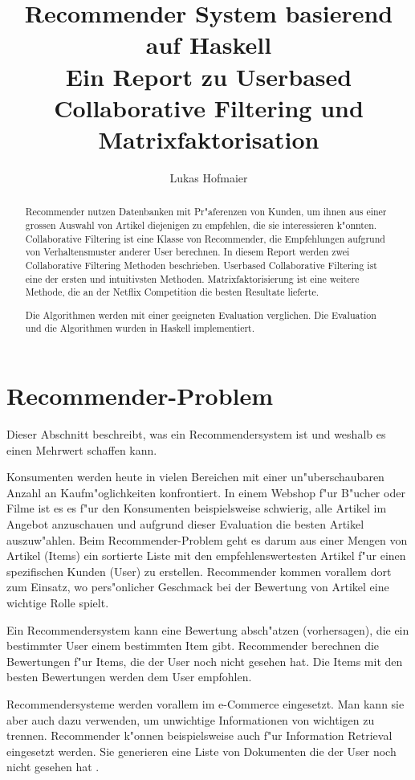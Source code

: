 \documentclass[a4paper, 12pt]{article}
\author{Lukas Hofmaier}
\title{Recommender System basierend auf Haskell \\ \vspace{2 mm} {\large Ein Report zu Userbased Collaborative Filtering und Matrixfaktorisation}}
\begin{document}
\lstset{basicstyle=\small,
language=Haskell,
stringstyle=ttfamiliy
}

\maketitle
\newpage
\tableofcontents
\newpage
\begin{abstract}
Recommender nutzen Datenbanken mit Pr"aferenzen von Kunden, um ihnen aus einer grossen Auswahl von Artikel diejenigen zu empfehlen, die sie interessieren k"onnten. Collaborative Filtering ist eine Klasse von Recommender, die Empfehlungen aufgrund von Verhaltensmuster anderer User berechnen.
In diesem Report werden zwei Collaborative Filtering Methoden beschrieben. Userbased Collaborative Filtering ist eine der ersten und intuitivsten Methoden. Matrixfaktorisierung ist eine weitere Methode, die an der Netflix Competition die besten Resultate lieferte.

Die Algorithmen werden mit einer geeigneten Evaluation verglichen. Die Evaluation und die Algorithmen wurden in Haskell implementiert.

\end{abstract}

\section{Recommender-Problem}
\label{sec:problem}
Dieser Abschnitt beschreibt, was ein Recommendersystem ist und weshalb es einen Mehrwert schaffen kann.

Konsumenten werden heute in vielen Bereichen mit einer un"uberschaubaren Anzahl an Kaufm"oglichkeiten konfrontiert. In einem Webshop f"ur B"ucher oder Filme ist es es f"ur den Konsumenten beispielsweise schwierig, alle Artikel im Angebot anzuschauen und aufgrund dieser Evaluation die besten Artikel auszuw"ahlen. Beim Recommender-Problem geht es darum aus einer Mengen von Artikel (Items) ein sortierte Liste mit den empfehlenswertesten Artikel f"ur einen spezifischen Kunden (User) zu erstellen. Recommender kommen vorallem dort zum Einsatz, wo pers"onlicher Geschmack bei der Bewertung von Artikel eine wichtige Rolle spielt.

Ein Recommendersystem kann eine Bewertung absch"atzen (vorhersagen), die ein bestimmter User einem bestimmten Item gibt. Recommender berechnen die Bewertungen f"ur Items, die der User noch nicht gesehen hat. Die Items mit den besten Bewertungen werden dem User empfohlen.

Recommendersysteme werden vorallem im e-Commerce eingesetzt. Man kann sie aber auch dazu verwenden, um unwichtige Informationen von wichtigen zu trennen. Recommender k"onnen beispielsweise auch f"ur Information Retrieval eingesetzt werden. Sie generieren eine Liste von Dokumenten die der User noch nicht gesehen hat \cite{herlocker00}.
\end{document}
